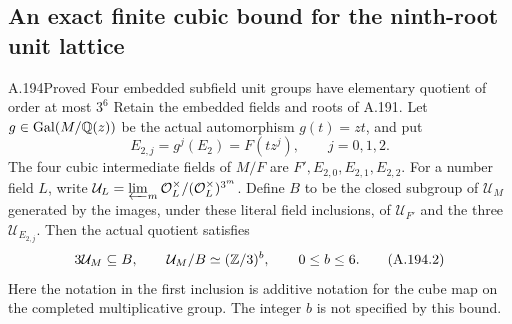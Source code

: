 \subsection{An exact finite cubic bound for the ninth-root unit lattice}

\begin{statement}{A.194}{Proved}
{Four embedded subfield unit groups have elementary quotient of order at most $3^6$}
Retain the embedded fields and roots of A.191.  Let
\(g\in\operatorname{Gal}(M/\mathbb Q(z))\) be the actual automorphism
\(g(t)=zt\), and put
\[
 E_{2,j}=g^j(E_2)=F(tz^j),\qquad j=0,1,2.
\tag{A.194.1}
\]
The four cubic intermediate fields of \(M/F\) are
\(F',E_{2,0},E_{2,1},E_{2,2}\).
For a number field \(L\), write
\(\mathcal U_L=\varprojlim_m\mathcal O_L^\times/
 (\mathcal O_L^\times)^{3^m}\).
Define \(B\) to be the closed subgroup of \(\mathcal U_M\)
generated by the images, under these literal field inclusions, of
\(\mathcal U_{F'}\) and the three \(\mathcal U_{E_{2,j}}\).
Then the actual quotient satisfies
\[
        3\mathcal U_M\subseteq B,\qquad
        \mathcal U_M/B\simeq(\mathbb Z/3)^b,
                    \qquad 0\leq b\leq6.
\tag{A.194.2}
\]
Here the notation in the first inclusion is additive notation for
the cube map on the completed multiplicative group.
The integer \(b\) is not specified by this bound.
\end{statement}

